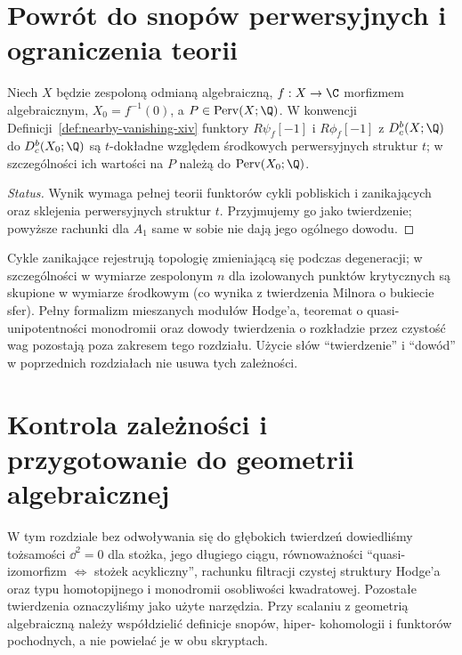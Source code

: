 \section{Powrót do snopów perwersyjnych i ograniczenia teorii}
\begin{twierdzenie}
Niech $X$ będzie zespoloną odmianą algebraiczną,
$f:X\to\C$ morfizmem algebraicznym,
$X_0=f^{-1}(0)$, a $P\in\operatorname{Perv}(X;\Q)$.
W konwencji Definicji~\ref{def:nearby-vanishing-xiv}
funktory $R\psi_f[-1]$ i $R\phi_f[-1]$
z $D_c^b(X;\Q)$ do $D_c^b(X_0;\Q)$
są $t$-dokładne względem środkowych
perwersyjnych struktur $t$; w szczególności
ich wartości na $P$ należą do
$\operatorname{Perv}(X_0;\Q)$.
\end{twierdzenie}
\begin{proof}[Status]
Wynik wymaga pełnej teorii funktorów cykli
pobliskich i zanikających oraz sklejenia
perwersyjnych struktur $t$. Przyjmujemy go
jako twierdzenie; powyższe rachunki dla
$A_1$ same w sobie nie dają jego ogólnego dowodu.
\end{proof}
\begin{uwaga}
Cykle zanikające rejestrują topologię zmieniającą
się podczas degeneracji; w szczególności w
wymiarze zespolonym $n$ dla izolowanych punktów
krytycznych są skupione w wymiarze środkowym
(co wynika z twierdzenia Milnora o bukiecie sfer).
Pełny formalizm mieszanych modułów Hodge'a,
teoremat o quasi-unipotentności monodromii
oraz dowody twierdzenia o rozkładzie przez
czystość wag pozostają poza zakresem tego rozdziału.
Użycie słów ``twierdzenie'' i ``dowód'' w
poprzednich rozdziałach nie usuwa tych zależności.
\end{uwaga}

\section{Kontrola zależności i przygotowanie do geometrii algebraicznej}
W tym rozdziale bez odwoływania się do głębokich twierdzeń
dowiedliśmy tożsamości
$\dd^2=0$ dla stożka, jego długiego ciągu,
równoważności ``quasi-izomorfizm $\Leftrightarrow$
stożek acykliczny'', rachunku filtracji
czystej struktury Hodge'a oraz typu homotopijnego
i monodromii osobliwości kwadratowej. Pozostałe
twierdzenia oznaczyliśmy jako użyte narzędzia.
Przy scalaniu z geometrią algebraiczną
należy współdzielić definicje snopów, hiper-
kohomologii i funktorów pochodnych, a nie
powielać je w obu skryptach.

